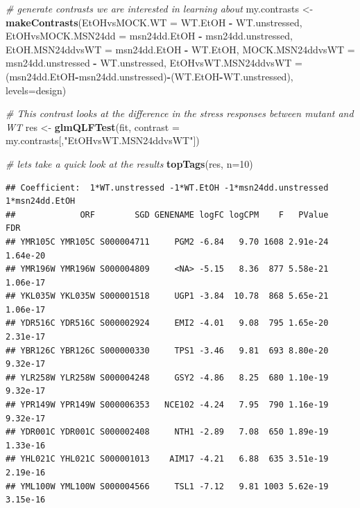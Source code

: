 \documentclass[
]{book}
\newenvironment{Shaded}{\begin{snugshade}}{\end{snugshade}}
\newcommand{\AttributeTok}[1]{\textcolor[rgb]{0.13,0.29,0.53}{#1}}
\newcommand{\CommentTok}[1]{\textcolor[rgb]{0.56,0.35,0.01}{\textit{#1}}}
\newcommand{\DecValTok}[1]{\textcolor[rgb]{0.00,0.00,0.81}{#1}}
\newcommand{\FunctionTok}[1]{\textcolor[rgb]{0.13,0.29,0.53}{\textbf{#1}}}
\newcommand{\NormalTok}[1]{#1}
\newcommand{\OtherTok}[1]{\textcolor[rgb]{0.56,0.35,0.01}{#1}}
\newcommand{\SpecialCharTok}[1]{\textcolor[rgb]{0.81,0.36,0.00}{\textbf{#1}}}
\newcommand{\StringTok}[1]{\textcolor[rgb]{0.31,0.60,0.02}{#1}}
\begin{document}
\begin{Shaded}
\begin{Highlighting}[]
\CommentTok{\# generate contrasts we are interested in learning about}
\NormalTok{my.contrasts }\OtherTok{\textless{}{-}} \FunctionTok{makeContrasts}\NormalTok{(}\AttributeTok{EtOHvsMOCK.WT =}\NormalTok{ WT.EtOH }\SpecialCharTok{{-}}\NormalTok{ WT.unstressed, }
                     \AttributeTok{EtOHvsMOCK.MSN24dd =}\NormalTok{ msn24dd.EtOH }\SpecialCharTok{{-}}\NormalTok{ msn24dd.unstressed,}
                     \AttributeTok{EtOH.MSN24ddvsWT =}\NormalTok{ msn24dd.EtOH }\SpecialCharTok{{-}}\NormalTok{ WT.EtOH,}
                     \AttributeTok{MOCK.MSN24ddvsWT =}\NormalTok{ msn24dd.unstressed }\SpecialCharTok{{-}}\NormalTok{ WT.unstressed,}
                     \AttributeTok{EtOHvsWT.MSN24ddvsWT =}\NormalTok{ (msn24dd.EtOH}\SpecialCharTok{{-}}\NormalTok{msn24dd.unstressed)}\SpecialCharTok{{-}}\NormalTok{(WT.EtOH}\SpecialCharTok{{-}}\NormalTok{WT.unstressed),}
                     \AttributeTok{levels=}\NormalTok{design)}

\CommentTok{\# This contrast looks at the difference in the stress responses between mutant and WT}
\NormalTok{res }\OtherTok{\textless{}{-}} \FunctionTok{glmQLFTest}\NormalTok{(fit, }\AttributeTok{contrast =}\NormalTok{ my.contrasts[,}\StringTok{"EtOHvsWT.MSN24ddvsWT"}\NormalTok{])}
\end{Highlighting}
\end{Shaded}

\begin{Shaded}
\begin{Highlighting}[]
\CommentTok{\# let\textquotesingle{}s take a quick look at the results}
\FunctionTok{topTags}\NormalTok{(res, }\AttributeTok{n=}\DecValTok{10}\NormalTok{) }
\end{Highlighting}
\end{Shaded}

\begin{verbatim}
## Coefficient:  1*WT.unstressed -1*WT.EtOH -1*msn24dd.unstressed 1*msn24dd.EtOH 
##             ORF        SGD GENENAME logFC logCPM    F   PValue      FDR
## YMR105C YMR105C S000004711     PGM2 -6.84   9.70 1608 2.91e-24 1.64e-20
## YMR196W YMR196W S000004809     <NA> -5.15   8.36  877 5.58e-21 1.06e-17
## YKL035W YKL035W S000001518     UGP1 -3.84  10.78  868 5.65e-21 1.06e-17
## YDR516C YDR516C S000002924     EMI2 -4.01   9.08  795 1.65e-20 2.31e-17
## YBR126C YBR126C S000000330     TPS1 -3.46   9.81  693 8.80e-20 9.32e-17
## YLR258W YLR258W S000004248     GSY2 -4.86   8.25  680 1.10e-19 9.32e-17
## YPR149W YPR149W S000006353   NCE102 -4.24   7.95  790 1.16e-19 9.32e-17
## YDR001C YDR001C S000002408     NTH1 -2.89   7.08  650 1.89e-19 1.33e-16
## YHL021C YHL021C S000001013    AIM17 -4.21   6.88  635 3.51e-19 2.19e-16
## YML100W YML100W S000004566     TSL1 -7.12   9.81 1003 5.62e-19 3.15e-16
\end{verbatim}
\end{document}
